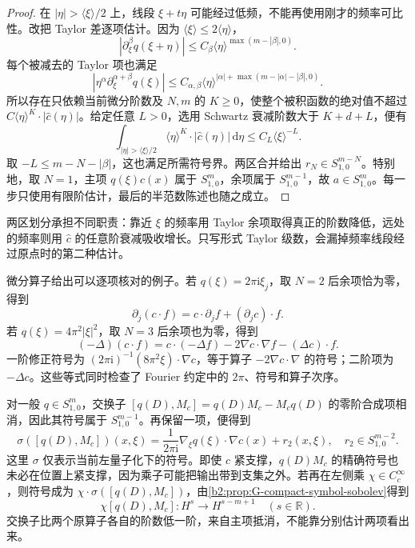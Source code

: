 \begin{proof}
在 \(|\eta|>\langle\xi\rangle/2\) 上，线段 \(\xi+t\eta\) 可能经过低频，不能再使用刚才的频率可比性。改把 Taylor 差逐项估计。因为 \(\langle\xi\rangle\le2\langle\eta\rangle\)，
\[
 |\partial_\xi^\beta q(\xi+\eta)|
 \le C_\beta\langle\eta\rangle^{\max(m-|\beta|,0)}.
\]
每个被减去的 Taylor 项也满足
\[
 \left|\eta^\alpha\partial_\xi^{\alpha+\beta}q(\xi)\right|
 \le C_{\alpha,\beta}
       \langle\eta\rangle^{|\alpha|+\max(m-|\alpha|-|\beta|,0)}.
\]
所以存在只依赖当前微分阶数及 \(N,m\) 的 \(K\ge0\)，使整个被积函数的绝对值不超过
\(C\langle\eta\rangle^K\cdot|\widehat c(\eta)|\)。给定任意 \(L>0\)，选用 Schwartz 衰减阶数大于 \(K+d+L\)，便有
\[
 \int_{|\eta|>\langle\xi\rangle/2}
   \langle\eta\rangle^K\cdot|\widehat c(\eta)|\,\mathrm d\eta
 \le C_L\langle\xi\rangle^{-L}.
\]
取 \(-L\le m-N-|\beta|\)，这也满足所需符号界。两区合并给出 \(r_N\in S^{m-N}_{1,0}\)。特别地，取 \(N=1\)，主项 \(q(\xi)c(x)\) 属于 \(S^m_{1,0}\)，余项属于 \(S^{m-1}_{1,0}\)，故 \(a\in S^m_{1,0}\)。每一步只使用有限阶估计，最后的半范数陈述也随之成立。
\end{proof}

两区划分承担不同职责：靠近 \(\xi\) 的频率用 Taylor 余项取得真正的阶数降低，远处的频率则用 \(\widehat c\) 的任意阶衰减吸收增长。只写形式 Taylor 级数，会漏掉频率线段经过原点时的第二种估计。

\ProseParagraphBreak

微分算子给出可以逐项核对的例子。若 \(q(\xi)=2\pi\mathrm i\xi_j\)，取 \(N=2\) 后余项恰为零，得到
\[
 \partial_j(c\cdot f)=c\cdot\partial_jf+(\partial_jc)\cdot f.
\]
若 \(q(\xi)=4\pi^2|\xi|^2\)，取 \(N=3\) 后余项也为零，得到
\[
 (-\Delta)(c\cdot f)
 =c\cdot(-\Delta f)-2\nabla c\cdot\nabla f-(\Delta c)\cdot f.
\]
一阶修正符号为 \((2\pi\mathrm i)^{-1}(8\pi^2\xi)\cdot\nabla c\)，等于算子 \(-2\nabla c\cdot\nabla\) 的符号；二阶项为 \(-\Delta c\)。这些等式同时检查了 Fourier 约定中的 \(2\pi\)、符号和算子次序。

\ProseParagraphBreak

对一般 \(q\in S^m_{1,0}\)，交换子 \([q(D),M_c]=q(D)M_c-M_cq(D)\) 的零阶合成项相消，因此其符号属于 \(S^{m-1}_{1,0}\)。再保留一项，便得到
\[
 \sigma([q(D),M_c])(x,\xi)
 =\frac1{2\pi\mathrm i}\nabla_\xi q(\xi)\cdot\nabla c(x)
        +r_2(x,\xi),
 \quad r_2\in S^{m-2}_{1,0}.
\]
这里 \(\sigma\) 仅表示当前左量子化下的符号。即使 \(c\) 紧支撑，\(q(D)M_c\) 的精确符号也未必在位置上紧支撑，因为乘子可能把输出带到支集之外。若再在左侧乘 \(\chi\in C_c^\infty\)，则符号成为 \(\chi\cdot\sigma([q(D),M_c])\)，由\cref{b2:prop:G-compact-symbol-sobolev}得到
\[
 \chi[q(D),M_c]:H^s\longrightarrow H^{s-m+1}
 \quad(s\in\mathbb R).
\]
交换子比两个原算子各自的阶数低一阶，来自主项抵消，不能靠分别估计两项看出来。

